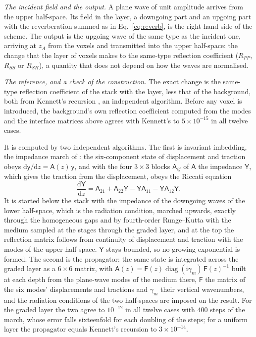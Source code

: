 \documentclass[preprint,review,12pt]{elsarticle}
\newcommand{\dd}{\mathrm{d}}
\begin{document}
\emph{The incident field and the output.} A plane wave of unit amplitude arrives from the upper
half-space. Its field in the layer, a downgoing part and an upgoing part with the reverberation summed
as in Eq.~\eqref{eq:reverb}, is the right-hand side of the scheme. The output is the upgoing wave of
the same type as the incident one, arriving at $z_A$ from the voxels and transmitted into the upper
half-space: the change that the layer of voxels makes to the same-type reflection coefficient ($R_{PP}$,
$R_{SS}$ or $R_{SH}$), a quantity that does not depend on how the waves are normalised.

\emph{The reference, and a check of the construction.} The exact change is the same-type reflection
coefficient of the stack with the layer, less that of the background, both from Kennett's recursion
\citep{Kennett1983}, an independent algorithm. Before any voxel is introduced, the background's own
reflection coefficient computed from the modes and the interface matrices above agrees with Kennett's
to $5\times10^{-15}$ in all twelve cases.

It is computed by two independent
algorithms. The first is invariant imbedding, the impedance march of \citet{Haines2004}: the
six-component state of displacement and traction obeys $\dd\mathsf{y}/\dd z=\mathsf{A}(z)\,\mathsf{y}$,
and with the four $3\times3$ blocks $\mathsf{A}_{ij}$ of $\mathsf{A}$ the impedance $\mathsf{Y}$, which
gives the traction from the displacement, obeys the Riccati equation
\begin{equation}\label{eq:riccati}
  \frac{\dd\mathsf{Y}}{\dd z}=\mathsf{A}_{21}+\mathsf{A}_{22}\mathsf{Y}-\mathsf{Y}\mathsf{A}_{11}
     -\mathsf{Y}\mathsf{A}_{12}\mathsf{Y}.
\end{equation}
It is started below the stack with the impedance of the downgoing waves of the lower half-space, which
is the radiation condition, marched upwards, exactly through the homogeneous gaps and by fourth-order
Runge--Kutta with the medium sampled at the stages through the graded layer, and at the top the
reflection matrix follows from continuity of displacement and traction with the modes of the upper
half-space. $\mathsf{Y}$ stays bounded, so no growing exponential is formed. The second is the
propagator: the same state is integrated across the graded layer as a $6\times6$ matrix, with
$\mathsf{A}(z)=\mathsf{F}(z)\operatorname{diag}(\mathrm{i}\gamma_m)\,\mathsf{F}(z)^{-1}$ built at each
depth from the plane-wave modes of the medium there, $\mathsf{F}$ the matrix of the six modes'
displacements and tractions and $\gamma_m$ their vertical wavenumbers, and the radiation conditions of
the two half-spaces are imposed on the result. For the graded layer the two agree to $10^{-12}$ in all
twelve cases with $400$ steps of the march, whose error falls sixteenfold for each doubling of the
steps; for a uniform layer the propagator equals Kennett's recursion to $3\times10^{-14}$. 
\end{document}
